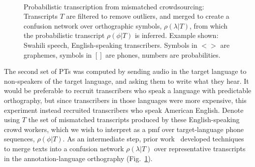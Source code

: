 \begin{figure}[b!]
\begin{center}
\\
\end{center}
\setlength{\abovecaptionskip}{0pt}
\caption{Probabilistic transcription from mismatched crowdsourcing:
  Transcripts $T$ are filtered to remove outliers, and merged to
  create a confusion network over orthographic symbols,
  $\rho(\lambda|T)$, from which the probabilistic transcript
  $\rho(\phi|T)$ is inferred. Example shown: Swahili speech,
  English-speaking transcribers.  Symbols in $<$$>$ are graphemes,
  symbols in $[]$ are phones, numbers are probabilities.}
\label{fig:mcmethods}
\end{figure}

The second set of PTs was computed by sending audio in the target
language to non-speakers of the target language, and asking them to
write what they hear.  It would be preferable to recruit transcribers
who speak a language with predictable orthography, but since
transcribers in those languages were more expensive, this
experiment instead recruited transcribers who speak American English.
Denote using $T$ the set of mismatched
transcripts produced by these English-speaking crowd workers,
which we wish to interpret as a pmf over
target-language phone sequences, $\rho(\phi|T)$.  As an intermediate
step, prior work~\cite{JHJ15b} developed techniques
to merge texts into a confusion network
$\rho(\lambda|T)$ over representative transcripts in the
annotation-language orthography (Fig.~\ref{fig:mcmethods}).

